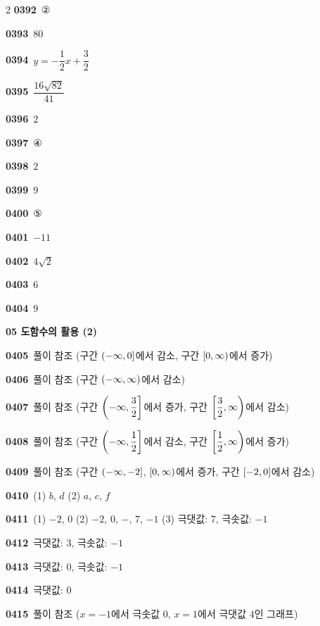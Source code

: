 \documentclass[10pt,a4paper]{article}
\begin{document}
\begin{multicols}{2}
\noindent\textbf{0392}\ ②\par
\noindent\textbf{0393}\ $80$\par
\noindent\textbf{0394}\ $y=-\dfrac{1}{2}x+\dfrac{3}{2}$\par
\noindent\textbf{0395}\ $\dfrac{16\sqrt{82}}{41}$\par
\noindent\textbf{0396}\ $2$\par
\noindent\textbf{0397}\ ④\par
\noindent\textbf{0398}\ $2$\par
\noindent\textbf{0399}\ $9$\par
\noindent\textbf{0400}\ ⑤\par
\noindent\textbf{0401}\ $-11$\par
\noindent\textbf{0402}\ $4\sqrt{2}$\par
\noindent\textbf{0403}\ $6$\par
\noindent\textbf{0404}\ $9$\par
\noindent\textbf{05 도함수의 활용 (2)}\par\smallskip
\noindent\textbf{0405}\ 풀이 참조 (구간 $(-\infty{,}\mkern3mu\mathopen{}0]$에서 감소, 구간 $[0{,}\mkern3mu\mathopen{}\infty)$에서 증가)\par
\noindent\textbf{0406}\ 풀이 참조 (구간 $(-\infty{,}\mkern3mu\mathopen{}\infty)$에서 감소)\par
\noindent\textbf{0407}\ 풀이 참조 (구간 $\left(-\infty{,}\mkern3mu\mathopen{}\dfrac{3}{2}\right]$에서 증가, 구간 $\left[\dfrac{3}{2}{,}\mkern3mu\mathopen{}\infty\right)$에서 감소)\par
\noindent\textbf{0408}\ 풀이 참조 (구간 $\left(-\infty{,}\mkern3mu\mathopen{}\dfrac{1}{2}\right]$에서 감소, 구간 $\left[\dfrac{1}{2}{,}\mkern3mu\mathopen{}\infty\right)$에서 증가)\par
\noindent\textbf{0409}\ 풀이 참조 (구간 $(-\infty{,}\mkern3mu\mathopen{}-2]$, $[0{,}\mkern3mu\mathopen{}\infty)$에서 증가, 구간 $[-2{,}\mkern3mu\mathopen{}0]$에서 감소)\par
\noindent\textbf{0410}\ (1) $b$, $d$ \quad (2) $a$, $c$, $f$\par
\noindent\textbf{0411}\ (1) $-2$, $0$ \quad (2) $-2$, $0$, $-$, $7$, $-1$ \quad (3) 극댓값: $7$, 극솟값: $-1$\par
\noindent\textbf{0412}\ 극댓값: $3$, 극솟값: $-1$\par
\noindent\textbf{0413}\ 극댓값: $0$, 극솟값: $-1$\par
\noindent\textbf{0414}\ 극댓값: $0$\par
\noindent\textbf{0415}\ 풀이 참조 ($x=-1$에서 극솟값 $0$, $x=1$에서 극댓값 $4$인 그래프)\par

\end{multicols}
\end{document}
